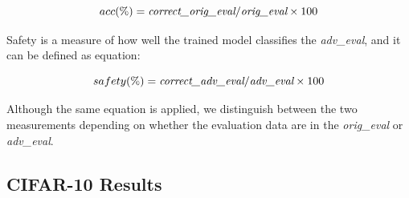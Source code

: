 \documentclass[journal,article,submit,moreauthors,pdftex]{Definitions/mdpi}
\begin{document}
\begin{equation}
    acc(\%) = \text{{\it correct\_orig\_eval}} / \text{{\it orig\_eval}} \times 100
\end{equation} 

Safety is a measure of how well the trained model classifies the {\it adv\_eval}, and it can be defined as equation:

\begin{equation}
    safety(\%) = \text{{\it correct\_adv\_eval}} / \text{{\it adv\_eval}} \times 100
\end{equation}

Although the same equation is applied, we distinguish between the two measurements depending on whether the evaluation data are in the {\it orig\_eval} or {\it adv\_eval}.

\subsection{CIFAR-10 Results}
\end{document}
